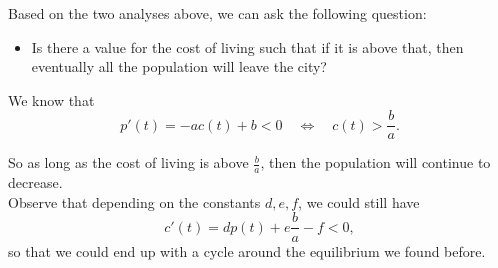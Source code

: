 Based on the two analyses above, we can ask the following question:
\begin{itemize}
	\item Is there a value for the cost of living such that if it is above that, then eventually all the population will leave the city?
\end{itemize}

We know that 
$$
p'(t) = -a c(t) + b < 0 \quad \Leftrightarrow \quad c(t) > \frac{b}{a}.
$$

So as long as the cost of living is above $\frac{b}{a}$, then the population will continue to decrease. \\

Observe that depending on the constants $d, e, f$, we could still have
$$
c'(t) = d p(t) + e \frac{b}{a} - f < 0,
$$
so that we could end up with a cycle around the equilibrium we found before.








